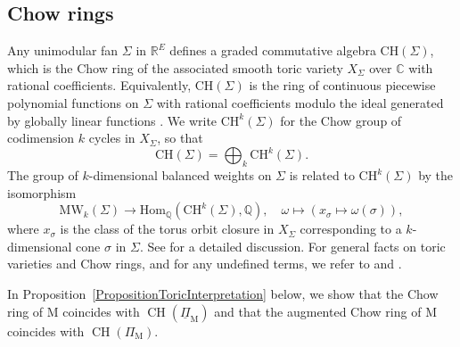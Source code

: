 \documentclass[11pt,reqno]{amsart}
\theoremstyle{definition}
\theoremstyle{remark}
\renewcommand{\(}{\left(}
\renewcommand{\)}{\right)}
\newcommand{\<}{\left<}
\renewcommand{\>}{\right>}
\newcommand{\CH}{\operatorname{CH}}
\begin{document}
\subsection{Chow rings}\label{sec:rings}


Any unimodular fan $\Sigma$ in $\mathbb{R}^E$ defines a graded commutative algebra $\mathrm{CH}(\Sigma)$,
which is the Chow ring of the associated smooth toric variety $X_\Sigma$ over $\mathbb{C}$ with rational coefficients. %
Equivalently, $\mathrm{CH}(\Sigma)$ is the ring of continuous piecewise polynomial functions on $\Sigma$ with rational coefficients 
modulo the ideal generated by globally linear functions \cite[Section 3.1]{Brion}.
We write $\mathrm{CH}^k(\Sigma)$ for the Chow group of codimension $k$ cycles in $X_\Sigma$, so that
\[
\mathrm{CH}(\Sigma)=\bigoplus_{k} \mathrm{CH}^k(\Sigma).
\]
The group of $k$-dimensional balanced weights on $\Sigma$ is related to $\mathrm{CH}^k(\Sigma)$ by the isomorphism
\[
\mathrm{MW}_k(\Sigma) \longrightarrow \mathrm{Hom}_\mathbb{Q}(\mathrm{CH}^k(\Sigma),\mathbb{Q}), \quad \omega \longmapsto (x_\sigma \longmapsto \omega(\sigma)),
\]
where $x_\sigma$ is the class of the torus orbit closure in $X_\Sigma$ corresponding to a $k$-dimensional cone $\sigma$ in $\Sigma$.
See \cite[Section 5]{AHK} for a detailed discussion.
For general facts on toric varieties and Chow rings, and for any undefined terms, we refer to \cite{CLS} and \cite{Fulton}.

In Proposition~\ref{PropositionToricInterpretation} below, we show that the Chow ring of $\mathrm{M}$ coincides with $\CH(\underline{\Pi}_\mathrm{M})$
and that the augmented Chow ring of $\mathrm{M}$ coincides with $\CH(\Pi_\mathrm{M})$.
\end{document}
